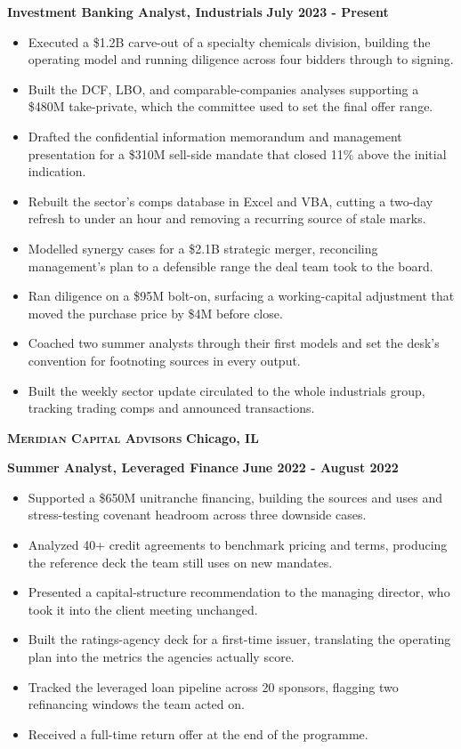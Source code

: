 \documentclass{article}
\begin{document}
\noindent \textbf{Investment Banking Analyst, Industrials} \hfill \textbf{July 2023 - Present}
\begin{itemize}
	\item Executed a \$1.2B carve-out of a specialty chemicals division, building the operating model and running diligence across four bidders through to signing.
	\item Built the DCF, LBO, and comparable-companies analyses supporting a \$480M take-private, which the committee used to set the final offer range.
	\item Drafted the confidential information memorandum and management presentation for a \$310M sell-side mandate that closed 11\% above the initial indication.
	\item Rebuilt the sector's comps database in Excel and VBA, cutting a two-day refresh to under an hour and removing a recurring source of stale marks.
	\item Modelled synergy cases for a \$2.1B strategic merger, reconciling management's plan to a defensible range the deal team took to the board.
	\item Ran diligence on a \$95M bolt-on, surfacing a working-capital adjustment that moved the purchase price by \$4M before close.
	\item Coached two summer analysts through their first models and set the desk's convention for footnoting sources in every output.
	\item Built the weekly sector update circulated to the whole industrials group, tracking trading comps and announced transactions.
\end{itemize}

\noindent \textbf{\textsc{Meridian Capital Advisors}} \hfill \textbf{Chicago, IL}

\noindent \textbf{Summer Analyst, Leveraged Finance} \hfill \textbf{June 2022 - August 2022}
\begin{itemize}
	\item Supported a \$650M unitranche financing, building the sources and uses and stress-testing covenant headroom across three downside cases.
	\item Analyzed 40+ credit agreements to benchmark pricing and terms, producing the reference deck the team still uses on new mandates.
	\item Presented a capital-structure recommendation to the managing director, who took it into the client meeting unchanged.
	\item Built the ratings-agency deck for a first-time issuer, translating the operating plan into the metrics the agencies actually score.
	\item Tracked the leveraged loan pipeline across 20 sponsors, flagging two refinancing windows the team acted on.
	\item Received a full-time return offer at the end of the programme.
\end{itemize}
\end{document}
